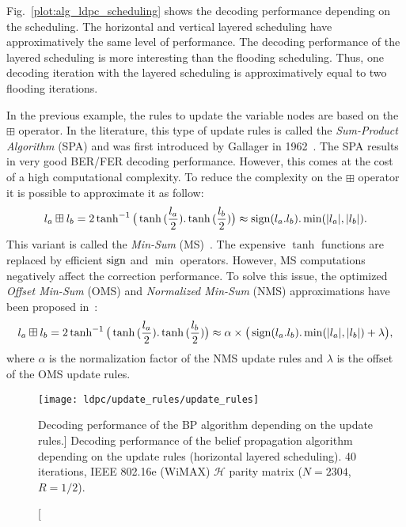 Fig.~\ref{plot:alg_ldpc_scheduling} shows the decoding performance depending on
the scheduling. The horizontal and vertical layered scheduling have
approximatively the same level of performance. The decoding performance of the
layered scheduling is more interesting than the flooding scheduling. Thus, one
decoding iteration with the layered scheduling is approximatively equal to two
flooding iterations.

In the previous example, the rules to update the variable nodes are based on the
$\boxplus$ operator. In the literature, this type of update rules is called the
\emph{Sum-Product Algorithm} (SPA) and was first introduced by Gallager in
1962~\cite{Gallager1962}. The SPA results in very good BER/FER decoding
performance. However, this comes at the cost of a high computational complexity.
To reduce the complexity on the $\boxplus$ operator it is possible to
approximate it as follow:
\begin{equation}
\label{eq:alg_ldpc_ms}
l_a \boxplus l_b = 2\tanh^{-1}{\big(\tanh{(\frac{l_a}{2}).\tanh{(\frac{l_b}{2})}}\big)} \approx \operatorname*{sign}(l_a.l_b).\min(|l_a|, |l_b|).
\end{equation}
This variant is called the \emph{Min-Sum} (MS)~\cite{Fossorier1999}.
The expensive $\tanh$ functions are replaced by efficient $\operatorname*{sign}$ and $\min$
operators. However, MS computations negatively affect the correction
performance. To solve this issue, the optimized \emph{Offset Min-Sum} (OMS) and
\emph{Normalized Min-Sum} (NMS) approximations have been proposed
in~\cite{Chen2002}:
\begin{equation}
\label{eq:alg_ldpc_onms}
l_a \boxplus l_b = 2\tanh^{-1}{\big(\tanh{(\frac{l_a}{2}).\tanh{(\frac{l_b}{2})}}\big)} \approx \alpha \times \big( \operatorname*{sign}(l_a.l_b).\min(|l_a|, |l_b|) + \lambda \big),
\end{equation}
where $\alpha$ is the normalization factor of the NMS update rules and $\lambda$
is the offset of the OMS update rules.

\begin{figure}[htp]
  \centering
  \texttt{[image: ldpc/update\_rules/update\_rules]}
  \caption
    [Decoding performance of the BP algorithm depending on the update rules.]
    {Decoding performance of the belief propagation algorithm depending on the
     update rules (horizontal layered scheduling). 40 iterations, IEEE 802.16e
     (WiMAX) $\mathcal{H}$ parity matrix ($N=2304$, $R=1/2$).}
  \label{plot:alg_ldpc_update_rules}
\end{figure}


